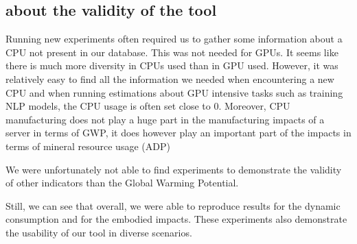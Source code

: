\documentclass[11pt]{article}
\begin{document}
\subsection{about the validity of the tool}
\label{sec:org09f822c}

Running new experiments often required us to gather some information
about a CPU not present in our database. This was not needed for
GPUs. It seems like there is much more diversity in CPUs used than in
GPU used. However, it was relatively easy to find all the information
we needed when encountering a new CPU and when running estimations
about GPU intensive tasks such as training NLP models, the CPU usage
is often set close to 0. Moreover, CPU manufacturing does not play a
huge part in the manufacturing impacts of a server in terms of
\gls{GWP}, it does however play an important part of the impacts in
terms of mineral resource usage (ADP)

We were unfortunately not able to find experiments to demonstrate the
validity of other indicators than the Global Warming Potential.

Still, we can see that overall, we were able to reproduce results for the
dynamic consumption and for the embodied impacts. These experiments
also demonstrate the usability of our tool in diverse scenarios.
\end{document}
